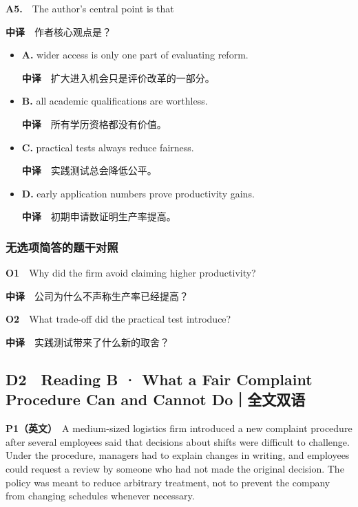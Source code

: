 \documentclass[
  11pt,
]{ctexart}
\begin{document}
\textbf{A5.}　The author's central point is that

\textbf{中译}　作者核心观点是？

\begin{itemize}
\item
  \textbf{A.} wider access is only one part of evaluating reform.

  \textbf{中译}　扩大进入机会只是评价改革的一部分。
\item
  \textbf{B.} all academic qualifications are worthless.

  \textbf{中译}　所有学历资格都没有价值。
\item
  \textbf{C.} practical tests always reduce fairness.

  \textbf{中译}　实践测试总会降低公平。
\item
  \textbf{D.} early application numbers prove productivity gains.

  \textbf{中译}　初期申请数证明生产率提高。
\end{itemize}

\subsubsection{无选项简答的题干对照}\label{ux65e0ux9009ux9879ux7b80ux7b54ux7684ux9898ux5e72ux5bf9ux7167}

\textbf{O1}　Why did the firm avoid claiming higher productivity?

\textbf{中译}　公司为什么不声称生产率已经提高？

\textbf{O2}　What trade-off did the practical test introduce?

\textbf{中译}　实践测试带来了什么新的取舍？

\subsection{D2　Reading B · What a Fair Complaint Procedure Can and
Cannot
Do｜全文双语}\label{d2-reading-b-what-a-fair-complaint-procedure-can-and-cannot-doux5168ux6587ux53ccux8bed}

\textbf{P1（英文）}　A medium-sized logistics firm introduced a new
complaint procedure after several employees said that decisions about
shifts were difficult to challenge. Under the procedure, managers had to
explain changes in writing, and employees could request a review by
someone who had not made the original decision. The policy was meant to
reduce arbitrary treatment, not to prevent the company from changing
schedules whenever necessary.
\end{document}
